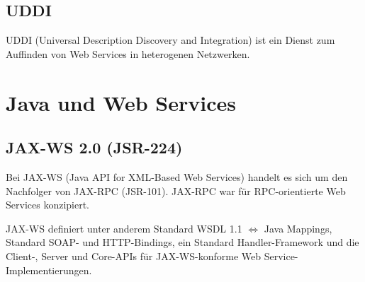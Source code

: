 \documentclass[runningheads]{llncs}
\begin{document}
%

  \label{uddi}
  \subsection{UDDI}
    UDDI\cite{wk_uddi} (Universal Description Discovery and Integration) ist ein Dienst zum Auffinden von Web Services in heterogenen Netzwerken.


  \label{wsj}
  \section{Java und Web Services}

  \label{jsr224}
  \subsection{JAX-WS 2.0 (JSR-224)}
    Bei JAX-WS\cite{jsr_224} (Java API for XML-Based Web Services) handelt es sich um den Nachfolger von JAX-RPC (JSR-101). JAX-RPC war für RPC-orientierte Web Services konzipiert.

    JAX-WS definiert unter anderem Standard WSDL 1.1 $\Leftrightarrow$ Java Mappings, Standard SOAP- und HTTP-Bindings, ein Standard Handler-Framework und die Client-, Server und Core-APIs für JAX-WS-konforme Web Service-Im\-ple\-men\-tier\-ung\-en.
\end{document}
